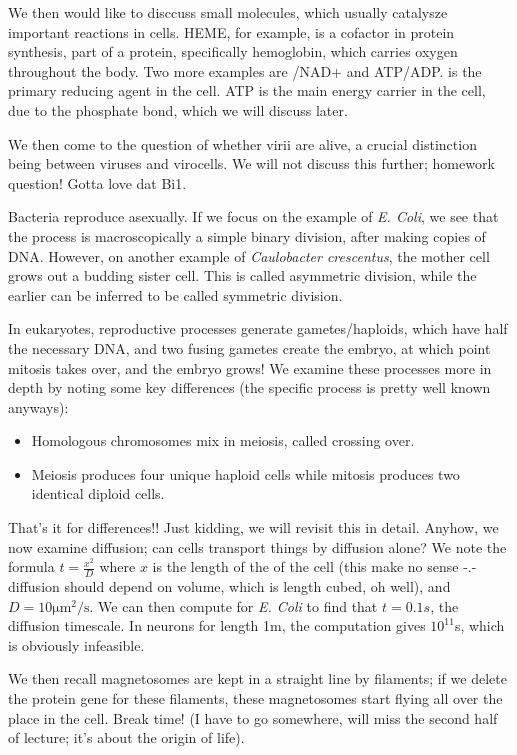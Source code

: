 \documentclass[12pt]{article}
\begin{document}
We then would like to disccuss small molecules, which usually catalysze important reactions in cells. HEME, for example, is a cofactor in protein synthesis, part of a protein, specifically hemoglobin, which carries oxygen throughout the body. Two more examples are /NAD+ and ATP/ADP.  is the primary reducing agent in the cell. ATP is the main energy carrier in the cell, due to the phosphate bond, which we will discuss later.

We then come to the question of whether virii are alive, a crucial distinction being between viruses and virocells. We will not discuss this further; homework question! Gotta love dat Bi1.

Bacteria reproduce asexually. If we focus on the example of \emph{E. Coli}, we see that the process is macroscopically a simple binary division, after making copies of DNA. However, on another example of \emph{Caulobacter crescentus}, the mother cell grows out a budding sister cell. This is called asymmetric division, while the earlier can be inferred to be called symmetric division.

In eukaryotes, reproductive processes generate gametes/haploids, which have half the necessary DNA, and two fusing gametes create the embryo, at which point mitosis takes over, and the embryo grows! We examine these processes more in depth by noting some key differences (the specific process is pretty well known anyways):
\begin{itemize}
	\item Homologous chromosomes mix in meiosis, called crossing over. 
	\item Meiosis produces four unique haploid cells while mitosis produces two identical diploid cells.
\end{itemize}

That's it for differences!! Just kidding, we will revisit this in detail. Anyhow, we now examine diffusion; can cells transport things by diffusion alone? We note the formula $t = \frac{x^2}{D}$ where $x$ is the length of the of the cell (this make no sense -.- diffusion should depend on volume, which is length cubed, oh well), and $D = 10 \mathrm{\mu m^2/s}$. We can then compute for \emph{E. Coli} to find that $t = 0.1s$, the diffusion timescale. In neurons for length 1m, the computation gives $10^{11}$s, which is obviously infeasible. 

We then recall magnetosomes are kept in a straight line by filaments; if we delete the protein gene for these filaments, these magnetosomes start flying all over the place in the cell. Break time! (I have to go somewhere, will miss the second half of lecture; it's about the origin of life). 
\end{document}
